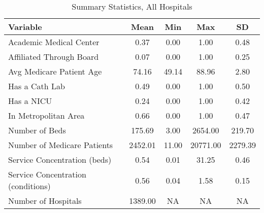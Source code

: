 \begin{table}[ht!]

\caption{Summary Statistics, All Hospitals\label{all_sumstats}}
\centering
\begin{tabular}[t]{lcccc}
\toprule
Variable & Mean & Min & Max & SD\\
\midrule
Academic Medical Center & 0.37 & 0.00 & 1.00 & 0.48\\
Affiliated Through Board & 0.07 & 0.00 & 1.00 & 0.25\\
Avg Medicare Patient Age & 74.16 & 49.14 & 88.96 & 2.80\\
Has a Cath Lab & 0.49 & 0.00 & 1.00 & 0.50\\
Has a NICU & 0.24 & 0.00 & 1.00 & 0.42\\
\addlinespace
In Metropolitan Area & 0.66 & 0.00 & 1.00 & 0.47\\
Number of Beds & 175.69 & 3.00 & 2654.00 & 219.70\\
Number of Medicare Patients & 2452.01 & 11.00 & 20771.00 & 2279.39\\
Service Concentration (beds) & 0.54 & 0.01 & 31.25 & 0.46\\
Service Concentration (conditions) & 0.56 & 0.04 & 1.58 & 0.15\\
\addlinespace
Number of Hospitals & 1389.00 & NA & NA & NA\\
\bottomrule
\end{tabular}
\end{table}
